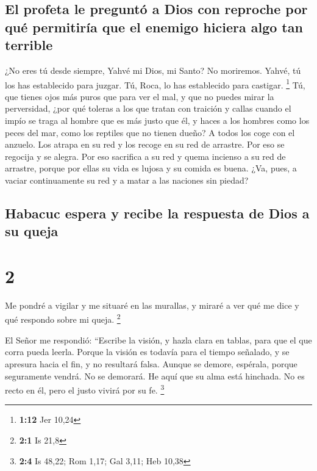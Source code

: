\hypertarget{el-profeta-le-preguntuxf3-a-dios-con-reproche-por-quuxe9-permitiruxeda-que-el-enemigo-hiciera-algo-tan-terrible}{%
\subsection{El profeta le preguntó a Dios con reproche por qué
permitiría que el enemigo hiciera algo tan
terrible}\label{el-profeta-le-preguntuxf3-a-dios-con-reproche-por-quuxe9-permitiruxeda-que-el-enemigo-hiciera-algo-tan-terrible}}

 ¿No eres tú desde siempre, Yahvé mi Dios, mi Santo? No
moriremos. Yahvé, tú los has establecido para juzgar. Tú, Roca, lo has
establecido para castigar. \footnote{\textbf{1:12} Jer 10,24}
 Tú, que tienes ojos más puros que para ver el mal, y que
no puedes mirar la perversidad, ¿por qué toleras a los que tratan con
traición y callas cuando el impío se traga al hombre que es más justo
que él,  y haces a los hombres como los peces del mar,
como los reptiles que no tienen dueño?  A todos los coge
con el anzuelo. Los atrapa en su red y los recoge en su red de arrastre.
Por eso se regocija y se alegra.  Por eso sacrifica a su
red y quema incienso a su red de arrastre, porque por ellas su vida es
lujosa y su comida es buena.  ¿Va, pues, a vaciar
continuamente su red y a matar a las naciones sin piedad?

\hypertarget{habacuc-espera-y-recibe-la-respuesta-de-dios-a-su-queja}{%
\subsection{Habacuc espera y recibe la respuesta de Dios a su
queja}\label{habacuc-espera-y-recibe-la-respuesta-de-dios-a-su-queja}}

\hypertarget{section-1}{%
\section{2}\label{section-1}}

 Me pondré a vigilar y me situaré en las murallas, y
miraré a ver qué me dice y qué respondo sobre mi queja. \footnote{\textbf{2:1}
  Is 21,8}

 El Señor me respondió: ``Escribe la visión, y hazla clara
en tablas, para que el que corra pueda leerla.  Porque la
visión es todavía para el tiempo señalado, y se apresura hacia el fin, y
no resultará falsa. Aunque se demore, espérala, porque seguramente
vendrá. No se demorará.  He aquí que su alma está
hinchada. No es recto en él, pero el justo vivirá por su fe. \footnote{\textbf{2:4}
  Is 48,22; Rom 1,17; Gal 3,11; Heb 10,38}

